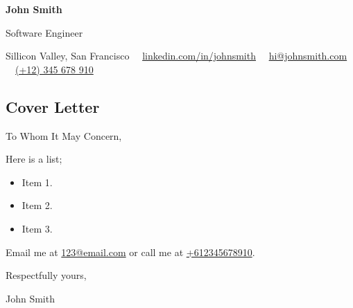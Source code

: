 \documentclass[10pt,a4paper]{article}
\begin{document}

\begin{center}
	{\LARGE \textbf{John Smith}}\vspace{0.2cm}
			
	{\large Software Engineer}\vspace{0.2cm}
			
	\faHome Sillicon Valley, San Francisco \ \
	\faLinkedin\href{https://linkedin.com/in/johnsmith}{linkedin.com/in/johnsmith} \ \
	\faEnvelope\href{mailto:hi@johnsmith.com}{hi@johnsmith.com} \ \
	\faMobile\href{tel:+12345678910}{(+12) 345 678 910} \ \
\end{center}



\subsection*{\textcolor{accent}{\Large Cover Letter  \sout{\hfill}}}

\setlength{\parskip}{\baselineskip}

To Whom It May Concern,

\lipsum[1]
	
\lipsum[2]

Here is a list;
\begin{itemize}
	\item Item 1.
	\item Item 2.
	\item Item 3.
\end{itemize}

\lipsum[3]

Email me at \href{mailto:123@email.com}{123@email.com} or call me at \href{tel:+612345678910}{+612345678910}.

Respectfully yours,

\vspace{1cm}

John Smith
\end{document}
